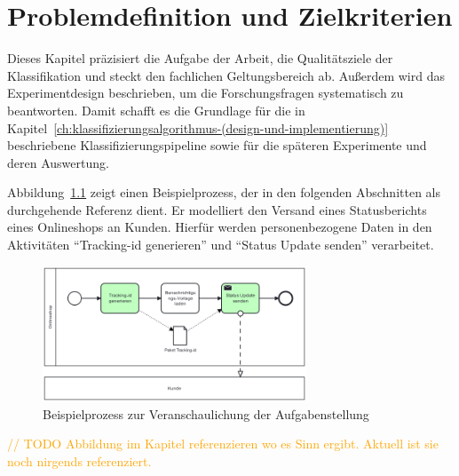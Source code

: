 \chapter{Problemdefinition und Zielkriterien}\label{ch:problemdefinition-und-zielkriterien}

Dieses Kapitel präzisiert die Aufgabe der Arbeit, die Qualitätsziele der Klassifikation und steckt den fachlichen Geltungsbereich ab. Außerdem wird das Experimentdesign beschrieben, um die Forschungsfragen systematisch zu beantworten. Damit schafft es die Grundlage für die in Kapitel~\ref{ch:klassifizierungsalgorithmus-(design-und-implementierung)} beschriebene Klassifizierungspipeline sowie für die späteren Experimente und deren Auswertung.

Abbildung~\ref{fig:running_example} zeigt einen Beispielprozess, der in den folgenden Abschnitten als durchgehende Referenz dient. Er modelliert den Versand eines Statusberichts eines Onlineshops an Kunden. Hierfür werden personenbezogene Daten in den Aktivitäten \enquote{Tracking-id generieren} und \enquote{Status Update senden} verarbeitet.

\begin{figure}[h]
    \centering
    \label{fig:running_example}
    \includegraphics[width=0.7\textwidth]{images/running_example}
    \caption{Beispielprozess zur Veranschaulichung der Aufgabenstellung}
\end{figure}

\textcolor{orange}{// TODO Abbildung im Kapitel referenzieren wo es Sinn ergibt. Aktuell ist sie noch nirgends referenziert.}





